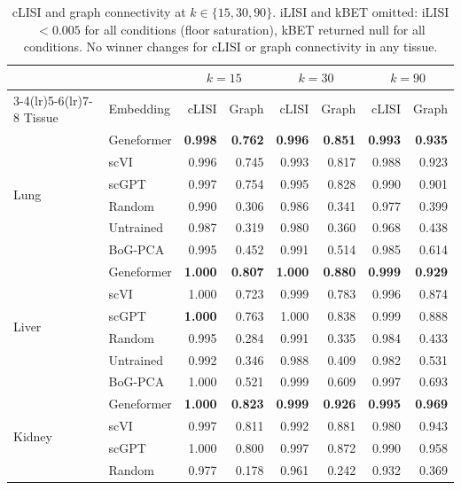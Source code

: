 \documentclass[10pt,letterpaper]{article}
\begin{document}
\begin{table}[h!]
\centering
\caption{cLISI and graph connectivity at $k \in \{15, 30, 90\}$. iLISI and kBET omitted: iLISI $< 0.005$ for all conditions (floor saturation), kBET returned null for all conditions. No winner changes for cLISI or graph connectivity in any tissue.}
\label{tab:app_knn}
\scriptsize
\begin{tabular}{@{}ll rr rr rr@{}}
\toprule
 & & \multicolumn{2}{c}{$k = 15$} & \multicolumn{2}{c}{$k = 30$} & \multicolumn{2}{c}{$k = 90$} \\
\cmidrule(lr){3-4}\cmidrule(lr){5-6}\cmidrule(lr){7-8}
Tissue & Embedding & cLISI & Graph & cLISI & Graph & cLISI & Graph \\
\midrule
\multirow{6}{*}{Lung}
 & Geneformer & \textbf{0.998} & \textbf{0.762} & \textbf{0.996} & \textbf{0.851} & \textbf{0.993} & \textbf{0.935} \\
 & scVI       & 0.996 & 0.745 & 0.993 & 0.817 & 0.988 & 0.923 \\
 & scGPT      & 0.997 & 0.754 & 0.995 & 0.828 & 0.990 & 0.901 \\
 & Random     & 0.990 & 0.306 & 0.986 & 0.341 & 0.977 & 0.399 \\
 & Untrained  & 0.987 & 0.319 & 0.980 & 0.360 & 0.968 & 0.438 \\
 & BoG-PCA    & 0.995 & 0.452 & 0.991 & 0.514 & 0.985 & 0.614 \\
\midrule
\multirow{6}{*}{Liver}
 & Geneformer & \textbf{1.000} & \textbf{0.807} & \textbf{1.000} & \textbf{0.880} & \textbf{0.999} & \textbf{0.929} \\
 & scVI       & 1.000 & 0.723 & 0.999 & 0.783 & 0.996 & 0.874 \\
 & scGPT      & \textbf{1.000} & 0.763 & 1.000 & 0.838 & 0.999 & 0.888 \\
 & Random     & 0.995 & 0.284 & 0.991 & 0.335 & 0.984 & 0.433 \\
 & Untrained  & 0.992 & 0.346 & 0.988 & 0.409 & 0.982 & 0.531 \\
 & BoG-PCA    & 1.000 & 0.521 & 0.999 & 0.609 & 0.997 & 0.693 \\
\midrule
\multirow{6}{*}{Kidney}
 & Geneformer & \textbf{1.000} & \textbf{0.823} & \textbf{0.999} & \textbf{0.926} & \textbf{0.995} & \textbf{0.969} \\
 & scVI       & 0.997 & 0.811 & 0.992 & 0.881 & 0.980 & 0.943 \\
 & scGPT      & 1.000 & 0.800 & 0.997 & 0.872 & 0.990 & 0.958 \\
 & Random     & 0.977 & 0.178 & 0.961 & 0.242 & 0.932 & 0.369 \\

\end{tabular}
\end{table}
\end{document}
